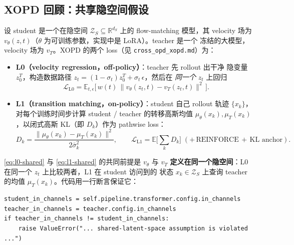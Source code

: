 \documentclass[11pt,a4paper]{article}
\newcommand{\loss}{\mathcal{L}}
\newcommand{\E}{\mathbb{E}}
\newcommand{\R}{\mathbb{R}}
\newcommand{\Zs}{\mathcal{Z}_S}
\newcommand{\vT}{v_{T}}
\newcommand{\vS}{v_{\theta}}
\theoremstyle{definition}
\begin{document}
\subsection{XOPD 回顾：共享隐空间假设}

设 student 是一个在隐空间 $\Zs\subseteq\R^{d_S}$ 上的 flow-matching 模型，其
velocity 场为 $\vS(z,t)$（$\theta$ 为可训练参数，实现中是 LoRA）。teacher 是一个
冻结的大模型，velocity 场为 $\vT$。XOPD 的两个 loss（见
\texttt{cross\_opd\_xopd.md}）为：

\begin{itemize}[leftmargin=1.4em]
\item \textbf{L0（velocity regression，off-policy）}：teacher 先 rollout 出干净
隐变量 $z_0^{T}$，构造数据路径 $z_t=(1-\sigma_t)z_0^T+\sigma_t\,\epsilon$，然后在
\emph{同一个} $z_t$ 上回归
\begin{equation}
\loss_{\mathrm{L0}}
=\E_{t,\epsilon}\Big[\,w(t)\,\big\lVert \vS(z_t,t)-\vT(z_t,t)\big\rVert^2\,\Big].
\label{eq:l0-shared}
\end{equation}

\item \textbf{L1（transition matching，on-policy）}：student 自己 rollout 轨迹
$\{x_k\}$，对每个训练时间步计算 student / teacher 的转移高斯均值
$\mu_\theta(x_k),\mu_T(x_k)$，以闭式高斯 KL（即 $D_k$）作为 pathwise loss：
\begin{equation}
D_k=\frac{\lVert \mu_\theta(x_k)-\mu_T(x_k)\rVert^2}{2\bar\sigma_k^2},
\qquad
\loss_{\mathrm{L1}}=\E\Big[\textstyle\sum_k D_k\Big]
\;(+\,\text{REINFORCE}\,+\,\text{KL anchor}).
\label{eq:l1-shared}
\end{equation}
\end{itemize}

\eqref{eq:l0-shared} 与 \eqref{eq:l1-shared} 的共同前提是 $\vS$ 与 $\vT$
\textbf{定义在同一个隐空间}：L0 在同一个 $z_t$ 上比较两者，L1 在 student 访问到的
状态 $x_k\in\Zs$ 上查询 teacher 的均值 $\mu_T(x_k)$。代码用一行断言保证它：

\begin{tcolorbox}[colback=red!4,colframe=red!50!black,title=\texttt{flux2\_klein.py:1363} 的硬约束]
\small
\begin{verbatim}
student_in_channels = self.pipeline.transformer.config.in_channels
teacher_in_channels = teacher.config.in_channels
if teacher_in_channels != student_in_channels:
    raise ValueError("... shared-latent-space assumption is violated ...")
\end{verbatim}
\end{tcolorbox}
\end{document}
